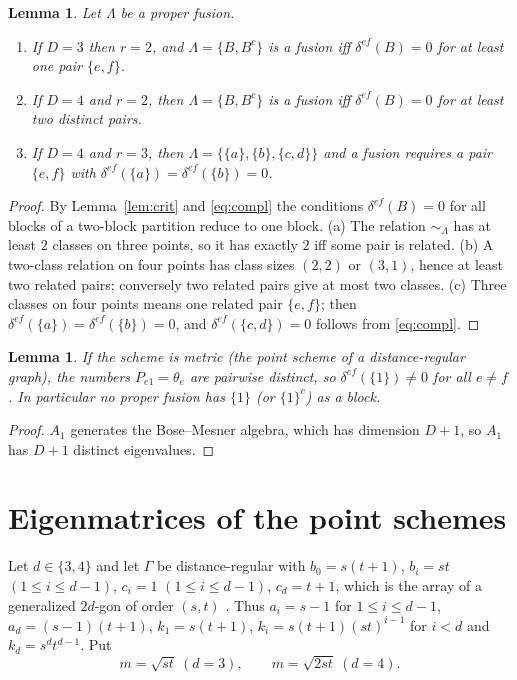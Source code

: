 \documentclass[11pt]{article}
\newtheorem{lemma}[theorem]{Lemma}
\theoremstyle{remark}
\begin{document}
\begin{lemma}\label{lem:count}
Let $\Lambda$ be a proper fusion.
\begin{enumerate}
\item[(a)] If $D=3$ then $r=2$, and $\Lambda=\{B,B^c\}$ is a fusion iff $\delta^{ef}(B)=0$ for at least one pair $\{e,f\}$.
\item[(b)] If $D=4$ and $r=2$, then $\Lambda=\{B,B^c\}$ is a fusion iff $\delta^{ef}(B)=0$ for at least two distinct pairs.
\item[(c)] If $D=4$ and $r=3$, then $\Lambda=\{\{a\},\{b\},\{c,d\}\}$ and a fusion requires a pair $\{e,f\}$ with $\delta^{ef}(\{a\})=\delta^{ef}(\{b\})=0$.
\end{enumerate}
\end{lemma}
\begin{proof}
By Lemma~\ref{lem:crit} and \eqref{eq:compl} the conditions $\delta^{ef}(B)=0$ for all blocks of a two-block partition reduce to one block. (a) The relation $\sim_\Lambda$ has at least $2$ classes on three points, so it has exactly $2$ iff some pair is related. (b) A two-class relation on four points has class sizes $(2,2)$ or $(3,1)$, hence at least two related pairs; conversely two related pairs give at most two classes. (c) Three classes on four points means one related pair $\{e,f\}$; then $\delta^{ef}(\{a\})=\delta^{ef}(\{b\})=0$, and $\delta^{ef}(\{c,d\})=0$ follows from \eqref{eq:compl}.
\end{proof}

\begin{lemma}\label{lem:A1}
If the scheme is metric (the point scheme of a distance-regular graph), the numbers $P_{e1}=\theta_e$ are pairwise distinct, so $\delta^{ef}(\{1\})\ne0$ for all $e\ne f$. In particular no proper fusion has $\{1\}$ (or $\{1\}^c$) as a block.
\end{lemma}
\begin{proof}
$A_1$ generates the Bose--Mesner algebra, which has dimension $D+1$, so $A_1$ has $D+1$ distinct eigenvalues.
\end{proof}

\section{Eigenmatrices of the point schemes}

Let $d\in\{3,4\}$ and let $\Gamma$ be distance-regular with $b_0=s(t+1)$, $b_i=st$ $(1\le i\le d-1)$, $c_i=1$ $(1\le i\le d-1)$, $c_d=t+1$, which is the array of a generalized $2d$-gon of order $(s,t)$ \cite[\S6.5]{BCN}. Thus $a_i=s-1$ for $1\le i\le d-1$, $a_d=(s-1)(t+1)$, $k_1=s(t+1)$, $k_i=s(t+1)(st)^{i-1}$ for $i<d$ and $k_d=s^dt^{d-1}$. Put
\[
m=\sqrt{st}\ (d=3),\qquad m=\sqrt{2st}\ (d=4).
\]
\end{document}
